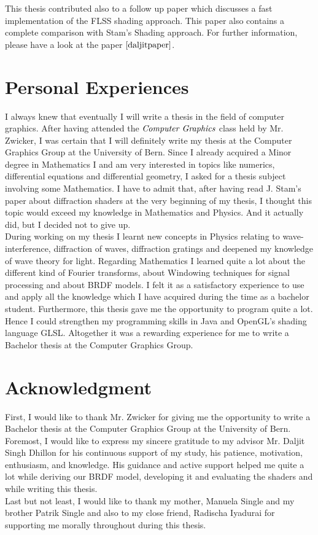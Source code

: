 This thesis contributed also to a follow up paper which discusses a fast implementation of the FLSS shading approach. This paper also contains a complete comparison with Stam's Shading approach. For further information, please have a look at the paper $\cite{daljitpaper}$.

\section{Personal Experiences}
I always knew that eventually I will write a thesis in the field of computer graphics. After having attended the $\emph{Computer Graphics}$ class held by Mr. Zwicker, I was certain that I will definitely write my thesis at the Computer Graphics Group at the University of Bern. Since I already acquired a Minor degree in Mathematics I and am very interested in topics like numerics, differential equations and differential geometry, I asked for a thesis subject involving some Mathematics. I have to admit that, after having read J. Stam's paper about diffraction shaders at the very beginning of my thesis, I thought this topic would exceed my knowledge in Mathematics and Physics. And it actually did, but I decided not to give up. \\

During working on my thesis I learnt new concepts in Physics relating to wave-interference, diffraction of waves, diffraction gratings and deepened my knowledge of wave theory for light. Regarding Mathematics I learned quite a lot about the different kind of Fourier transforms, about Windowing techniques for signal processing and about BRDF models. I felt it as a satisfactory experience to use and apply all the knowledge which I have acquired during the time as a bachelor student. Furthermore, this thesis gave me the opportunity to program quite a lot. Hence I could strengthen my programming skills in Java and OpenGL's shading language GLSL. Altogether it was a rewarding experience for me to write a Bachelor thesis at the Computer Graphics Group.

\section{Acknowledgment}
First, I would like to thank Mr. Zwicker for giving me the opportunity to write a Bachelor thesis at the Computer Graphics Group at the University of Bern. \\

Foremost, I would like to express my sincere gratitude to my advisor Mr. Daljit Singh Dhillon for his continuous support of my study, his patience, motivation, enthusiasm, and knowledge. His guidance and active support helped me quite a lot while deriving our BRDF model, developing it and evaluating the shaders and while writing this thesis. \\
  
Last but not least, I would like to thank my mother, Manuela Single and my brother Patrik Single and also to my close friend, Radischa Iyadurai for supporting me morally throughout during this thesis.
